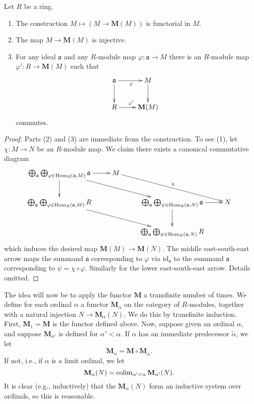 \begin{lemma}
\label{lemma-construction}
Let $R$ be a ring.
\begin{enumerate}
\item The construction $M \mapsto (M \to \mathbf{M}(M))$
is functorial in $M$.
\item The map $M \to \mathbf{M}(M)$ is injective.
\item For any ideal $\mathfrak{a}$ and any $R$-module map
$\varphi : \mathfrak a \to M$ there is an $R$-module map
$\varphi' : R \to \mathbf{M}(M)$ such that
$$
\xymatrix{
\mathfrak{a} \ar[d] \ar[r]_\varphi &  M \ar[d] \\
R \ar[r]^{\varphi'} & \mathbf{M}(M)
}
$$
commutes.
\end{enumerate}
\end{lemma}

\begin{proof}
Parts (2) and (3) are immediate from the construction.
To see (1), let $\chi : M \to N$ be an $R$-module map. We claim there exists
a canonical commutative diagram
$$
\xymatrix{
\bigoplus_{\mathfrak a}
\bigoplus_{\varphi \in \Hom_R(\mathfrak a, M)}
\mathfrak{a} \ar[r] \ar[d] \ar[rrd] & M \ar[rrd]^\chi \\
\bigoplus_{\mathfrak a}
\bigoplus_{\varphi \in \Hom_R(\mathfrak a, M)}
R \ar[rrd] & &
\bigoplus_{\mathfrak a}
\bigoplus_{\psi \in \Hom_R(\mathfrak a, N)}
\mathfrak{a} \ar[r] \ar[d] & N \\
& & \bigoplus_{\mathfrak a}
\bigoplus_{\psi \in \Hom_R(\mathfrak a, N)}
R
}
$$
which induces the desired map $\mathbf{M}(M) \to \mathbf{M}(N)$.
The middle east-south-east arrow maps the summand $\mathfrak a$
corresponding to $\varphi$ via $\text{id}_{\mathfrak a}$ to the
summand $\mathfrak a$ corresponding to $\psi = \chi \circ \varphi$.
Similarly for the lower east-south-east arrow. Details omitted.
\end{proof}

\noindent
The idea will now be to apply the functor $\mathbf{M}$ a transfinite number
of times. We define for each ordinal $\alpha$ a functor $\mathbf{M}_\alpha$
on the category of $R$-modules, together with a natural injection $N \to
\mathbf{M}_\alpha(N)$. We do this by transfinite induction.
First, $\mathbf{M}_1 = \mathbf{M}$ is the functor defined above.
Now, suppose given an ordinal $\alpha$, and suppose $\mathbf{M}_{\alpha'}$
is defined for $\alpha' < \alpha$. If $\alpha$ has an immediate predecessor
$\widetilde{\alpha}$, we let
$$
\mathbf{M}_\alpha = \mathbf{M} \circ \mathbf{M}_{\widetilde{\alpha}}.
$$
If not, i.e., if $\alpha$ is a limit ordinal, we let
$$
\mathbf{M}_{\alpha}(N) =
\mathop{\rm colim}\nolimits_{\alpha' < \alpha} \mathbf{M}_{\alpha'}(N).
$$
It is clear (e.g., inductively) that the $\mathbf{M}_{\alpha}(N)$
form an inductive system over ordinals, so this is reasonable.

